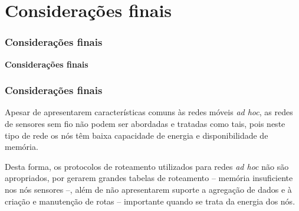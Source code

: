 \documentclass[notes]{beamer}
\begin{document}
\section{Considerações finais}
\begin{frame}
\label{slide_70}
\frametitle{Considerações finais}

\begin{block}

 \center \textbf{Considerações finais}

\end{block}

\end{frame}

\begin{frame}
\label{slide_71}
\frametitle{Considerações finais}

\begin{block}

Apesar de apresentarem características comuns às redes móveis \textit{ad hoc}, as redes de sensores sem fio não podem ser abordadas e tratadas como tais, pois neste tipo de rede os nós têm baixa capacidade de energia e disponibilidade de memória.
\end{block} \pause

\begin{block}

Desta forma, os protocolos de roteamento utilizados para redes \textit{ad hoc} não são apropriados, por gerarem grandes tabelas de roteamento – memória insuficiente nos nós sensores –, além de não apresentarem suporte a agregação de dados e à criação e manutenção de rotas – importante quando se trata da energia dos nós.  

\end{block} 

\end{frame}
\end{document}
